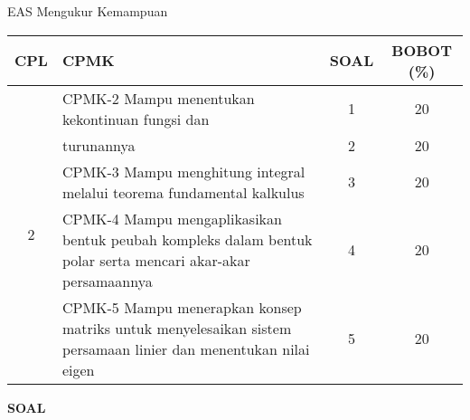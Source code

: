 \documentclass[10pt,openany,a4paper]{article}
\begin{document}
\begin{table}[h]
    \centering
    EAS Mengukur Kemampuan
    \begin{tabular}{|c|m{10.5cm}|c|c|}
        \hline
        CPL & CPMK                                                                                                          & SOAL & BOBOT (\%) \\ \hline
        \multirow{5}{*}{2}
            & CPMK-2 Mampu menentukan kekontinuan fungsi dan                                                                & 1    & 20         \\ \cline{3-4}
            & turunannya                                                                                                    & 2    & 20         \\\cline{2-4}
            & CPMK-3 Mampu menghitung integral melalui teorema fundamental kalkulus                                         & 3    & 20         \\ \cline{2-4}
            & CPMK-4 Mampu mengaplikasikan bentuk peubah kompleks dalam bentuk polar serta mencari akar-akar persamaannya   & 4    & 20         \\ \cline{2-4}
            & CPMK-5 Mampu menerapkan konsep matriks untuk menyelesaikan sistem persamaan linier dan menentukan nilai eigen & 5    & 20         \\ \hline
    \end{tabular}
\end{table}
{\centering\textbf{SOAL}}
\end{document}
